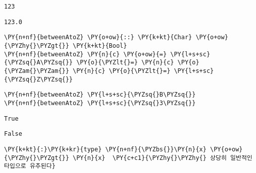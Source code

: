     
    \begin{Verbatim}[commandchars=\\\{\}]
123
    \end{Verbatim}

    
    
    \begin{Verbatim}[commandchars=\\\{\}]
123.0
    \end{Verbatim}

    
    \begin{tcolorbox}[breakable, size=fbox, boxrule=1pt, pad at break*=1mm,colback=cellbackground, colframe=cellborder, top=.75ex]
\begin{Verbatim}[commandchars=\\\{\}]
\PY{n+nf}{betweenAtoZ} \PY{o+ow}{::} \PY{k+kt}{Char} \PY{o+ow}{\PYZhy{}\PYZgt{}} \PY{k+kt}{Bool}
\PY{n+nf}{betweenAtoZ} \PY{n}{c} \PY{o+ow}{=} \PY{l+s+sc}{\PYZsq{}A\PYZsq{}} \PY{o}{\PYZlt{}=} \PY{n}{c} \PY{o}{\PYZam{}\PYZam{}} \PY{n}{c} \PY{o}{\PYZlt{}=} \PY{l+s+sc}{\PYZsq{}Z\PYZsq{}}
\end{Verbatim}
\end{tcolorbox}

    \begin{tcolorbox}[breakable, size=fbox, boxrule=1pt, pad at break*=1mm,colback=cellbackground, colframe=cellborder, top=.75ex]
\begin{Verbatim}[commandchars=\\\{\}]
\PY{n+nf}{betweenAtoZ} \PY{l+s+sc}{\PYZsq{}B\PYZsq{}}
\PY{n+nf}{betweenAtoZ} \PY{l+s+sc}{\PYZsq{}3\PYZsq{}}
\end{Verbatim}
\end{tcolorbox}

    
    \begin{Verbatim}[commandchars=\\\{\}]
True
    \end{Verbatim}

    
    
    \begin{Verbatim}[commandchars=\\\{\}]
False
    \end{Verbatim}

    
    \begin{tcolorbox}[breakable, size=fbox, boxrule=1pt, pad at break*=1mm,colback=cellbackground, colframe=cellborder, top=.75ex]
\begin{Verbatim}[commandchars=\\\{\}]
\PY{k+kt}{:}\PY{k+kr}{type} \PY{n+nf}{\PYZbs{}}\PY{n}{x} \PY{o+ow}{\PYZhy{}\PYZgt{}} \PY{n}{x}  \PY{c+c1}{\PYZhy{}\PYZhy{} 상당히 일반적인 타입으로 유추된다}
\end{Verbatim}
\end{tcolorbox}

